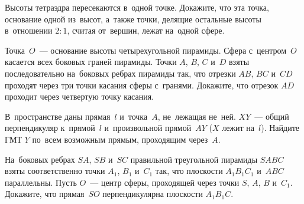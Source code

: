 \begin{problems}
\item
Высоты тетраэдра пересекаются в~одной точке.
Докажите, что эта точка, основание одной из~высот, а~также точки, делящие
остальные высоты в~отношении $2 : 1$, считая от~вершин, лежат на~одной сфере.



\item
Точка~$O$~— основание высоты четырехугольной пирамиды.
Сфера с~центром~$O$ касается всех боковых граней пирамиды.
Точки $A$, $B$, $C$ и~$D$ взяты последовательно на~боковых ребрах пирамиды так,
что отрезки $AB$, $BC$ и~$CD$ проходят через три точки касания сферы с~гранями.
Докажите, что отрезок $AD$ проходит через четвертую точку касания.

\item
В~пространстве даны прямая~$l$ и~точка~$A$, не~лежащая не~ней.
$XY$~— общий перпендикуляр к~прямой~$l$ и~произвольной прямой~$AY$
($X$ лежит на~$l$).
Найдите ГМТ $Y$ по~всем возможным прямым, проходящим через~$A$.

\item
На~боковых ребрах $SA$, $SB$ и~$SC$ правильной треугольной пирамиды $SABC$
взяты соответственно точки $A_1$, $B_1$ и~$C_1$ так, что плоскости
$A_1 B_1 C_1$ и~$ABC$ параллельны.
Пусть $O$~— центр сферы, проходящей через точки $S$, $A$, $B$ и~$C_1$.
Докажите, что прямая~$SO$ перпендикулярна плоскости $A_1 B_1 C$.

\end{problems}


